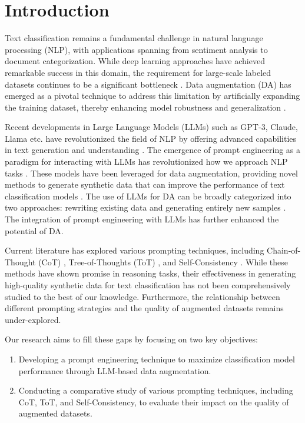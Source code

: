 \section{Introduction}
Text classification remains a fundamental challenge in natural language processing (NLP), with applications spanning from sentiment analysis to document categorization. While deep learning approaches have achieved remarkable success in this domain, the requirement for large-scale labeled datasets continues to be a significant bottleneck \cite{zhang2015character}. Data augmentation (DA) has emerged as a pivotal technique to address this limitation by artificially expanding the training dataset, thereby enhancing model robustness and generalization \cite{wei2019eda}.

Recent developments in Large Language Models (LLMs) such as GPT-3, Claude, Llama etc. have revolutionized the field of NLP by offering advanced capabilities in text generation and understanding \cite{brown2020language} \cite{llama3}. The emergence of prompt engineering as a paradigm for interacting with LLMs has revolutionized how we approach NLP tasks \cite{liu2023pre}. These models have been leveraged for data augmentation, providing novel methods to generate synthetic data that can improve the performance of text classification models \cite{zhao2024improving}. The use of LLMs for DA can be broadly categorized into two approaches: rewriting existing data and generating entirely new samples \cite{yang2023mini}. The integration of prompt engineering with LLMs has further enhanced the potential of DA.

Current literature has explored various prompting techniques, including Chain-of-Thought (CoT) \cite{wei2023chain}, Tree-of-Thoughts (ToT) \cite{yao2023tree}, and Self-Consistency \cite{wang2023self}. While these methods have shown promise in reasoning tasks, their effectiveness in generating high-quality synthetic data for text classification has not been comprehensively studied to the best of our knowledge. Furthermore, the relationship between different prompting strategies and the quality of augmented datasets remains under-explored.

Our research aims to fill these gaps by focusing on two key objectives:
\begin{enumerate}
    \item Developing a prompt engineering technique to maximize classification model performance through LLM-based data augmentation.
    \item Conducting a comparative study of various prompting techniques, including CoT, ToT, and Self-Consistency, to evaluate their impact on the quality of augmented datasets.
\end{enumerate}

